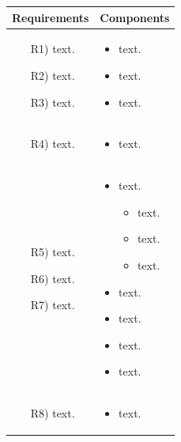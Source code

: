 \documentclass[table, 12pt]{article}
\begin{document}
\begin{longtable}{|p{}|p{}|}
    \hline
    \textbf{Requirements} & \textbf{Components} \\\hline\hline
    \begin{itemize}
        \item[R1)] text.
        \item[R2)] text.
        \item[R3)] text.
    \end{itemize}
    & 
    \begin{itemize}
        \item text.
        \item text.
        \item text.
    \end{itemize}
    \\\hline

    \begin{itemize}
        \item[R4)] text.
    \end{itemize}
    & 
    \begin{itemize}
        \item text.
    \end{itemize}
    \\\hline

    \begin{itemize}
        \item[R5)] text.
        \item[R6)] text.
        \item[R7)] text.
    \end{itemize}
    & 
    \begin{itemize}
        \item text.
        \begin{itemize}
            \setlength{\itemindent}{-5px}
            \item text.
            \item text.
            \item text.
        \end{itemize}
        \item text.
        \item text.
        \item text.
        \item text.
    \end{itemize}
    \\\hline

    \begin{itemize}
        \item[R8)] text.
    \end{itemize}
    & 
    \begin{itemize}
        \item text.
    \end{itemize}
    \\\hline


\end{longtable}
\end{document}
